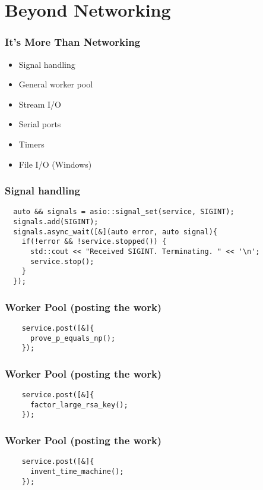 \section{Beyond Networking}

\begin{frame}
  \frametitle{It's More Than Networking}\pause{}
  \begin{itemize}
    \item{Signal handling}\pause{}
    \item{General worker pool}\pause{}
    \item{Stream I/O}\pause{}
    \item{Serial ports}\pause{}
    \item{Timers}\pause{}
    \item{File I/O (Windows)}
  \end{itemize}
\end{frame}

\begin{frame}[fragile]
  \frametitle{Signal handling}
  \begin{verbatim}
  auto && signals = asio::signal_set(service, SIGINT);
  signals.add(SIGINT);
  signals.async_wait([&](auto error, auto signal){
    if(!error && !service.stopped()) {
      std::cout << "Received SIGINT. Terminating. " << '\n';
      service.stop();
    }
  });
  \end{verbatim}
\end{frame}

\begin{frame}[fragile]
  \frametitle{Worker Pool (posting the work)}
  \begin{verbatim}
    service.post([&]{
      prove_p_equals_np();
    });
  \end{verbatim}
\end{frame}

\begin{frame}[fragile]
  \frametitle{Worker Pool (posting the work)}
  \begin{verbatim}
    service.post([&]{
      factor_large_rsa_key();
    });
  \end{verbatim}
\end{frame}

\begin{frame}[fragile]
  \frametitle{Worker Pool (posting the work)}
  \begin{verbatim}
    service.post([&]{
      invent_time_machine();
    });
  \end{verbatim}
\end{frame}

